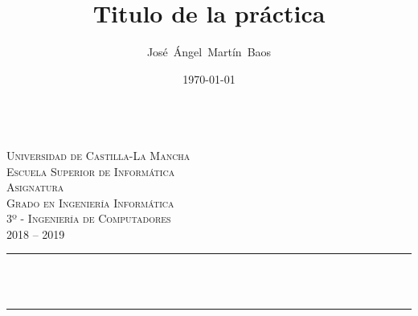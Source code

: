 \documentclass[11pt]{article}
\title{Titulo de la práctica}							%
\author{José~Ángel~Martín~Baos}							%
\date{\today}											%
\makeatletter
\newcommand{\subject}{Asignatura}						%
\newcommand{\course}{Grado en Ingeniería Informática \\ 3º - Ingeniería de Computadores}	%
\newcommand{\courseyear}{2018 -- 2019} 					%
\let\thetitle\@title
\makeatother
\begin{document}

\begin{titlepage}
	\centering
	\begin{minipage}[t]{\textwidth}
		\hspace{\fill}
	\end{minipage}
	\\[2.25 cm]
    \textsc{\LARGE Universidad de Castilla-La Mancha}\\[0.5 cm]	%
    \textsc{\LARGE Escuela Superior de Informática}\\[2.0 cm]
	\textsc{\Large \subject}\\[0.5 cm]				%
	\textsc{\large \course \\ \courseyear}\\[2 cm]				%
	\rule{\linewidth}{0.2 mm} \\[0.4 cm]
	{ \huge \bfseries \thetitle}\\
	\rule{\linewidth}{0.2 mm} \\[2.5 cm]


\end{titlepage}
\end{document}
